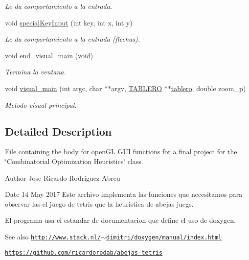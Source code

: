 \begin{DoxyCompactItemize}
\begin{DoxyCompactList}\small\item\em Le da comportamiento a la entrada. \end{DoxyCompactList}\item 
void \hyperlink{interfaz-grafica_8c_af3f54b3a1f56ec2bbffb19f34137f55e}{special\+Key\+Input} (int key, int x, int y)
\begin{DoxyCompactList}\small\item\em Le da comportamiento a la entrada (flechas). \end{DoxyCompactList}\item 
void \hyperlink{interfaz-grafica_8c_a343542b85d5e7ca60f02b99f0231f526}{end\+\_\+visual\+\_\+main} (void)
\begin{DoxyCompactList}\small\item\em Termina la ventana. \end{DoxyCompactList}\item 
void \hyperlink{interfaz-grafica_8c_a75a94e8110ac0ab4efe7bb0a9a1f0772}{visual\+\_\+main} (int argc, char $\ast$$\ast$argv, \hyperlink{tablero_8h_acbb1e9c862ccf810af77512ddb019a82}{T\+A\+B\+L\+E\+RO} $\ast$$\ast$\hyperlink{structtablero}{tablero}, double zoom\+\_\+p)
\begin{DoxyCompactList}\small\item\em Metodo visual principal. \end{DoxyCompactList}\end{DoxyCompactItemize}


\subsection{Detailed Description}
File containing the body for open\+GL G\+UI functions for a final project for the \char`\"{}\+Combinatorial Optimization Heuristics\char`\"{} class. 

\begin{DoxyAuthor}{Author}
Jose Ricardo Rodriguez Abreu 
\end{DoxyAuthor}
\begin{DoxyDate}{Date}
14 May 2017 Este archivo implementa las funciones que necesitamos para observar las el juego de tetris que la heuristica de abejas juegs.
\end{DoxyDate}
El programa usa el estandar de documentacion que define el uso de doxygen.

\begin{DoxySeeAlso}{See also}
\href{http://www.stack.nl/~dimitri/doxygen/manual/index.html}{\tt http\+://www.\+stack.\+nl/$\sim$dimitri/doxygen/manual/index.\+html} 

\href{https://github.com/ricardorodab/abejas-tetris}{\tt https\+://github.\+com/ricardorodab/abejas-\/tetris} 
\end{DoxySeeAlso}


